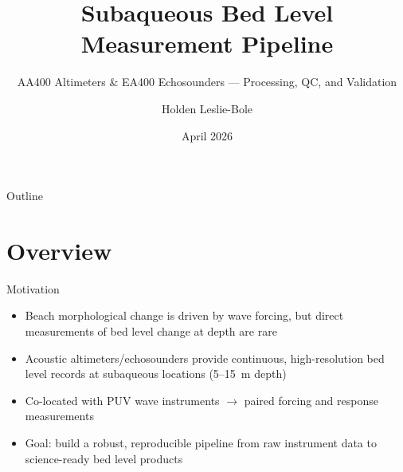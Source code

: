 \documentclass[10pt, aspectratio=169]{beamer}
\title{Subaqueous Bed Level Measurement Pipeline}
\subtitle{AA400 Altimeters \& EA400 Echosounders --- Processing, QC, and Validation}
\author{Holden Leslie-Bole}
\institute{Scripps Institution of Oceanography \\ Coastal Processes Group}
\date{April 2026}
\begin{document}
\maketitle

\begin{frame}{Outline}
  \tableofcontents
\end{frame}

\section{Overview}

\begin{frame}{Motivation}
  \begin{itemize}
    \item Beach morphological change is driven by wave forcing, but direct
          measurements of bed level change at depth are rare
    \item Acoustic altimeters/echosounders provide continuous, high-resolution
          bed level records at subaqueous locations (5--15~m depth)
    \item Co-located with PUV wave instruments $\rightarrow$ paired forcing
          and response measurements
    \item Goal: build a robust, reproducible pipeline from raw instrument
          data to science-ready bed level products
  \end{itemize}
\end{frame}
\end{document}
